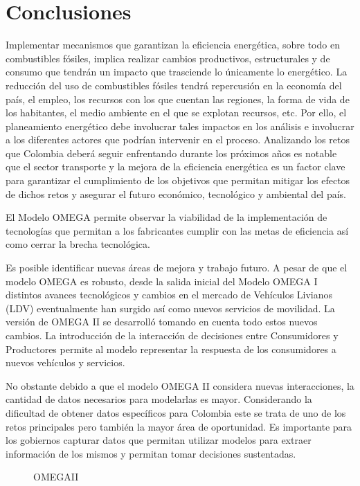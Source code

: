 \chapter{Conclusiones}

Implementar mecanismos que garantizan la eficiencia energética, sobre todo en combustibles fósiles, implica realizar cambios productivos, estructurales y de consumo que tendrán un impacto que trasciende lo únicamente lo energético. La reducción del uso de combustibles fósiles tendrá repercusión en la economía del país, el empleo, los recursos con los que cuentan las regiones, la forma de vida de los habitantes, el medio ambiente en el que se explotan recursos, etc. Por ello, el planeamiento energético debe involucrar tales impactos en los análisis e involucrar a los diferentes actores que podrían intervenir en el proceso. Analizando los retos que Colombia deberá seguir enfrentando durante los próximos años es notable que el sector transporte y la mejora de la eficiencia energética es un factor clave para garantizar el cumplimiento de los objetivos que permitan mitigar los efectos de dichos retos y asegurar el futuro económico, tecnológico y ambiental del país.

El Modelo OMEGA permite observar la viabilidad de la implementación de tecnologías que permitan a los fabricantes cumplir con las metas de eficiencia así como cerrar la brecha tecnológica.

Es posible identificar nuevas áreas de mejora y trabajo futuro. A pesar de que el modelo OMEGA es robusto, desde la salida inicial del Modelo OMEGA I distintos avances tecnológicos y cambios en el mercado de Vehículos Livianos (LDV) eventualmente han surgido así como nuevos servicios de movilidad. La versión de OMEGA II se desarrolló tomando en cuenta todo estos nuevos cambios. La introducción de la interacción de decisiones entre Consumidores y Productores permite al modelo representar la respuesta de los consumidores a nuevos vehículos y servicios.

No obstante debido a que el modelo OMEGA II considera nuevas interacciones, la cantidad de datos necesarios para modelarlas es mayor. Considerando la dificultad de obtener datos específicos para Colombia este se trata de uno de los retos principales pero también la mayor área de oportunidad. Es importante para los gobiernos capturar datos que permitan utilizar modelos para extraer información de los mismos y permitan tomar decisiones sustentadas.

\begin{figure}[htbp]
   \centering
   
    \caption{OMEGAII}
    \label{fig:omega2}
\end{figure}
